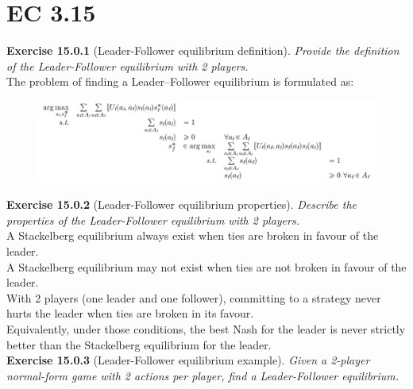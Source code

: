 \section{EC 3.15}
\textbf{Exercise 15.0.1} (Leader-Follower equilibrium definition). \textit{Provide the definition of the Leader-Follower equilibrium with 2 players.}\\

The problem of finding a Leader–Follower equilibrium is formulated as:
\begin{figure}[H]
\centering
\includegraphics[width=\textwidth]{images/img_3_15_01.png}
\end{figure}

\textbf{Exercise 15.0.2} (Leader-Follower equilibrium properties). \textit{Describe the properties of the Leader-Follower equilibrium with 2 players.}\\

A Stackelberg equilibrium always exist when ties are broken in favour of the leader.\\
A Stackelberg equilibrium may not exist when ties are not broken in favour of the leader.\\
With 2 players (one leader and one follower), committing to a strategy never hurts the leader when ties are broken in its favour.\\
Equivalently, under those conditions, the best Nash for the leader is never strictly better than the Stackelberg equilibrium for the leader.\\

\textbf{Exercise 15.0.3} (Leader-Follower equilibrium example). \textit{Given a 2-player normal-form game with 2 actions per player, find a Leader-Follower equilibrium.}\\

